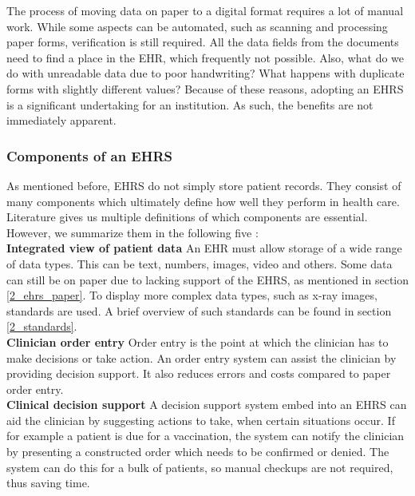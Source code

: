         The process of moving data on paper to a digital format requires a lot of manual work. While some aspects can be automated, such as scanning and processing paper forms, verification is still required. All the data fields from the documents need to find a place in the EHR, which frequently not possible. Also, what do we do with unreadable data due to poor handwriting? What happens with duplicate forms with slightly different values? Because of these reasons, adopting an EHRS is a significant undertaking for an institution. As such, the benefits are not immediately apparent.

        \subsubsection{Components of an EHRS}

        As mentioned before, EHRS do not simply store patient records. They consist of many components which ultimately define how well they perform in health care. Literature gives us multiple definitions of which components are essential. However, we summarize them in the following five \cite{biomedical_informatics}:\\

        \noindent\textbf{Integrated view of patient data} An EHR must allow storage of a wide range of data types. This can be text, numbers, images, video and others. Some data can still be on paper due to lacking support of the EHRS, as mentioned in section \ref{2_ehrs_paper}. To display more complex data types, such as x-ray images, standards are used. A brief overview of such standards can be found in section \ref{2_standards}.\\

        \noindent\textbf{Clinician order entry} Order entry is the point at which the clinician has to make decisions or take action. An order entry system can assist the clinician by providing decision support. It also reduces errors and costs compared to paper order entry.\\

        \noindent\textbf{Clinical decision support} A decision support system embed into an EHRS can aid the clinician by suggesting actions to take, when certain situations occur. If for example a patient is due for a vaccination, the system can notify the clinician by presenting a constructed order which needs to be confirmed or denied. The system can do this for a bulk of patients, so manual checkups are not required, thus saving time.\\

